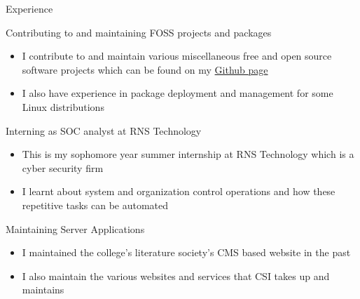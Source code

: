 \documentclass{article}
\newlength{\tabin}
\newlength{\secsep}
\newcommand{\lineunder}{\vspace*{-8pt} \\ \hspace*{-6pt} \hrulefill \\ \vspace*{-15pt}}
\newenvironment{tabbedsection}[1]{
	\begin{list}{}{
		\setlength{\itemsep}{0pt}
		\setlength{\labelsep}{0pt}
		\setlength{\labelwidth}{0pt}
		\setlength{\leftmargin}{\tabin}
		\setlength{\rightmargin}{\tabin}
		\setlength{\listparindent}{0pt}
		\setlength{\parsep}{0pt}
		\setlength{\parskip}{0pt}
		\setlength{\partopsep}{0pt}
		\setlength{\topsep}{#1}
	}
	\item[]
}{\end{list}}
\newenvironment{resume_section}[1]{
	\filbreak
	\vspace{2\secsep}
	\textsc{\large#1}
	\lineunder
	\begin{tabbedsection}{\secsep}
}{\end{tabbedsection}}
\newenvironment{resume_subsection}[2][]{
	\textbf{#2} \hfill {\footnotesize #1} \hspace{2em}
	\begin{tabbedsection}{0.5\secsep}
}{\end{tabbedsection}}
\newenvironment{subitems}{
	\renewcommand{\labelitemi}{-}
	\begin{itemize}
		\setlength{\labelsep}{1em}
}{\end{itemize}}
\begin{document}
\begin{resume_section}{Experience}
	\begin{resume_subsection}{Contributing to and maintaining FOSS projects and packages}
		\begin{subitems}
		\item I contribute to and maintain various miscellaneous free
			and open source software projects which can be found on
			my \href{https://github.com/nimaipatel}{Github page}
		\item I also have experience in package deployment and
			management for some Linux distributions
		\end{subitems}
	\end{resume_subsection}

	\begin{resume_subsection}{Interning as SOC analyst at RNS Technology}
		\begin{subitems}
		\item This is my sophomore year summer internship at RNS Technology
			which is a cyber security firm
		\item I learnt about system and organization control operations and
			how these repetitive tasks can be automated
		\end{subitems}
	\end{resume_subsection}

	\begin{resume_subsection}{Maintaining Server Applications}
		\begin{subitems}
			\item I maintained the college's literature society's
				CMS based website in the past
			\item I also maintain the various websites and services
				that CSI takes up and maintains
		\end{subitems}
	\end{resume_subsection}

\end{resume_section}
\end{document}
